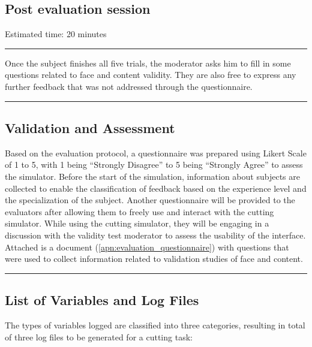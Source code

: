 \subsection{Post evaluation session}
Estimated time: 20 minutes\\[-2ex]
\hrule%
Once the subject finishes all five trials, the moderator asks him to fill in some questions related to face and content validity. They are also free to express any further feedback that was not addressed through the questionnaire.

\hrule%

\subsection{Validation and Assessment}

Based on the evaluation protocol, a questionnaire was prepared using Likert Scale of 1 to 5, with 1 being \enquote{Strongly Disagree} to 5 being \enquote{Strongly Agree} to assess the simulator. Before the start of the simulation, information about subjects are collected to enable the classification of feedback based on the experience level and the specialization of the subject. Another questionnaire will be provided to the evaluators after allowing them to freely use and interact with the cutting simulator. While using the cutting simulator, they will be engaging in a discussion with the validity test moderator to assess the usability of the interface. Attached is a document (\autoref{apn:evaluation_questionnaire}) with questions that were used to collect information related to validation studies of face and content.



\hrule%



\subsection{List of Variables and Log Files}

The types of variables logged are classified into three categories, resulting in  total of three log files to be generated for a cutting task:

